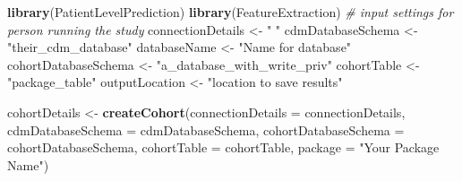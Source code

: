 \documentclass[]{article}
\newenvironment{Shaded}{\begin{snugshade}}{\end{snugshade}}
\newcommand{\KeywordTok}[1]{\textcolor[rgb]{0.13,0.29,0.53}{\textbf{#1}}}
\newcommand{\DataTypeTok}[1]{\textcolor[rgb]{0.13,0.29,0.53}{#1}}
\newcommand{\StringTok}[1]{\textcolor[rgb]{0.31,0.60,0.02}{#1}}
\newcommand{\CommentTok}[1]{\textcolor[rgb]{0.56,0.35,0.01}{\textit{#1}}}
\newcommand{\NormalTok}[1]{#1}
\begin{document}
\begin{Shaded}
\begin{Highlighting}[]
\KeywordTok{library}\NormalTok{(PatientLevelPrediction)}
\KeywordTok{library}\NormalTok{(FeatureExtraction)}
\CommentTok{# input settings for person running the study}
\NormalTok{connectionDetails <-}\StringTok{ " "}
\NormalTok{cdmDatabaseSchema <-}\StringTok{ "their_cdm_database"}
\NormalTok{databaseName <-}\StringTok{ "Name for database"}
\NormalTok{cohortDatabaseSchema <-}\StringTok{ "a_database_with_write_priv"}
\NormalTok{cohortTable <-}\StringTok{ "package_table"}
\NormalTok{outputLocation <-}\StringTok{ "location to save results"}

\NormalTok{cohortDetails <-}\StringTok{ }\KeywordTok{createCohort}\NormalTok{(}\DataTypeTok{connectionDetails =}\NormalTok{ connectionDetails, }\DataTypeTok{cdmDatabaseSchema =}\NormalTok{ cdmDatabaseSchema, }
    \DataTypeTok{cohortDatabaseSchema =}\NormalTok{ cohortDatabaseSchema, }\DataTypeTok{cohortTable =}\NormalTok{ cohortTable, }
    \DataTypeTok{package =} \StringTok{"Your Package Name"}\NormalTok{)}


\end{Highlighting}
\end{Shaded}
\end{document}
